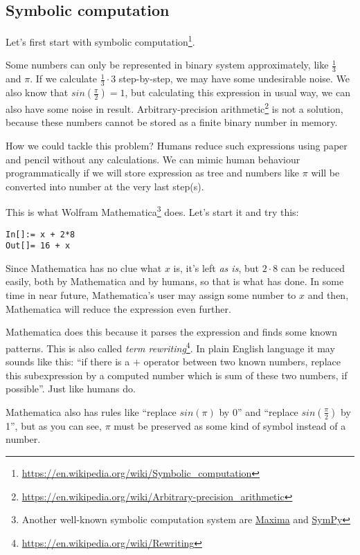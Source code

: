\subsection{Symbolic computation}

Let's first start with symbolic computation\footnote{\url{https://en.wikipedia.org/wiki/Symbolic_computation}}.

Some numbers can only be represented in binary system approximately, like $\frac{1}{3}$ and $\pi$.
If we calculate $\frac{1}{3} \cdot 3$ step-by-step, we may have some undesirable noise.
We also know that $sin(\frac{\pi}{2}) = 1$, but calculating this expression in usual way, we can also have some noise in result.
Arbitrary-precision arithmetic\footnote{\url{https://en.wikipedia.org/wiki/Arbitrary-precision_arithmetic}} is not a solution,
because these numbers cannot be stored as a finite binary number in memory.

How we could tackle this problem?
Humans reduce such expressions using paper and pencil without any calculations.
We can mimic human behaviour programmatically if we will store expression as tree and numbers like $\pi$ will be converted into number at the very last step(s).

This is what Wolfram Mathematica\footnote{Another well-known symbolic computation system are 
\href{https://en.wikipedia.org/wiki/Maxima_\%28software\%29}{Maxima} and 
\href{https://en.wikipedia.org/wiki/SymPy}{SymPy}} does.
Let's start it and try this:

\begin{lstlisting}
In[]:= x + 2*8
Out[]= 16 + x
\end{lstlisting}

Since Mathematica has no clue what $x$ is, it's left \textit{as is}, but $2 \cdot 8$ can be reduced easily, both by Mathematica and by humans,
so that is what has done.
In some time in near future, Mathematica's user may assign some number to $x$ and then, Mathematica will reduce the expression even further.

Mathematica does this because it parses the expression and finds some known patterns.
This is also called \textit{term rewriting}\footnote{\url{https://en.wikipedia.org/wiki/Rewriting}}.
In plain English language it may sounds like this:
``if there is a $+$ operator between two known numbers, replace this subexpression by a computed number which is sum of these two numbers, if possible''.
Just like humans do.

Mathematica also has rules like ``replace $sin(\pi)$ by 0'' and ``replace $sin(\frac{\pi}{2})$ by 1'', but as you can see, $\pi$ must be preserved
as some kind of symbol instead of a number.

